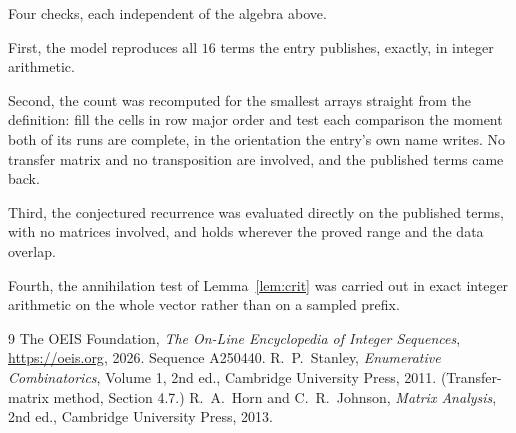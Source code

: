 \documentclass[11pt,a4paper]{article}
\theoremstyle{plain}
\theoremstyle{definition}
\begin{document}
Four checks, each independent of the algebra above.

First, the model reproduces all $16$ terms the entry publishes, exactly, in integer
arithmetic.

Second, the count was recomputed for the smallest arrays straight from the definition: fill the
cells in row major order and test each comparison the moment both of its runs are complete,
in the orientation the entry's own name writes. No transfer matrix and no transposition are
involved, and the published terms came back.

Third, the conjectured recurrence was evaluated directly on the published terms, with no
matrices involved, and holds wherever the proved range and the data overlap.

Fourth, the annihilation test of Lemma~\ref{lem:crit} was carried out in exact integer
arithmetic on the whole vector rather than on a sampled prefix.

\begin{thebibliography}{9}
 The OEIS Foundation, \emph{The On-Line Encyclopedia of Integer
Sequences}, \url{https://oeis.org}, 2026. Sequence A250440.
 R.~P.~Stanley, \emph{Enumerative Combinatorics}, Volume 1, 2nd ed.,
Cambridge University Press, 2011. (Transfer-matrix method, Section 4.7.)
 R.~A.~Horn and C.~R.~Johnson, \emph{Matrix Analysis}, 2nd ed., Cambridge
University Press, 2013.
\end{thebibliography}
\end{document}
